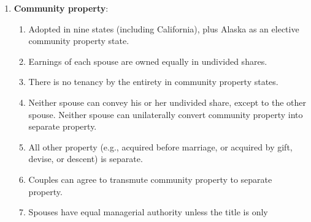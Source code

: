 \begin{enumerate}
\begin{enumerate}
        \textbf{equitable distribution}, with a trend towards equal 
        distribution. There are three types:
        \begin{enumerate}
            \item \textbf{Divide all property}, regardless of time or manner 
            of acquisition.
            \item Divide all property \textbf{acquired during marriage}, 
            regardless of manner.
            \item Divide all property \textbf{acquired during marriage from 
            earnings}.\footnote{Casebook p. 370 and Gilbert pp. 199--200.}
        \end{enumerate}
        \item Alimony has largely disappeared, except ``rehabilitative 
        alimony.''
        \item Most states treat professional degrees as non-marital property. 
        \emph{In re Marriage of Graham.} Some states adopt the opposite rule, 
        but this can be problematic if the degree holder remarries and becomes 
        obligated to give earnings to both spouses. See J. Thomas Oldham, 
        ``Putting Asunder in the 1990s''
        \item Some states have held \textbf{celebrity status} to be marital 
        property. \emph{Elkus v. Elkus}.
    \end{enumerate}
    \item \textbf{Community property}:
    \begin{enumerate}
        \item Adopted in nine states (including California), plus Alaska as an 
        elective community property state.
        \item Earnings of each spouse are owned equally in undivided shares.
        \item There is no tenancy by the entirety in community property 
        states.
        \item Neither spouse can convey his or her undivided share, except to 
        the other spouse. Neither spouse can unilaterally convert community 
        property into separate property.
        \item All other property (e.g., acquired before marriage, or acquired 
        by gift, devise, or descent) is separate.
        \item Couples can agree to transmute community property to separate 
        property.
        \item Spouses have equal managerial authority unless the title is only 

\end{enumerate}
\end{enumerate}

